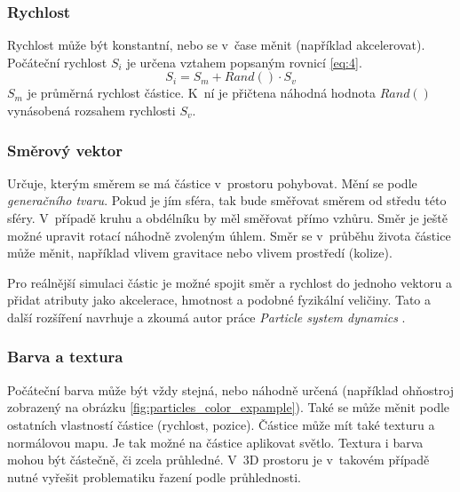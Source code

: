 \subsubsection*{Rychlost} Rychlost může být konstantní, nebo se v~čase měnit (například akcelerovat). Počáteční rychlost \(S_i\) je určena vztahem popsaným rovnicí \ref{eq:4}.
\begin{equation}
S_i = S_m + Rand() \cdot S_v
\label{eq:4}
\end{equation}
\(S_m\) je průměrná rychlost částice. K~ní je přičtena náhodná hodnota \(Rand()\) vynásobená rozsahem rychlosti \(S_v\). 
\subsubsection*{Směrový vektor} Určuje, kterým směrem se má částice v~prostoru pohybovat. Mění se podle \emph{generačního tvaru}. Pokud je jím sféra, tak bude směřovat směrem od středu této sféry. V~případě kruhu a obdélníku by měl směřovat přímo vzhůru. Směr je ještě možné upravit rotací náhodně zvoleným úhlem. Směr se v~průběhu života částice může měnit, například vlivem gravitace nebo vlivem prostředí (kolize).

Pro reálnější simulaci částic je možné spojit směr a rychlost do jednoho vektoru a přidat atributy jako akcelerace, hmotnost a podobné fyzikální veličiny. Tato a další rozšíření navrhuje a zkoumá autor práce \emph{Particle system dynamics} \cite{witkin1999particle}. 

\subsubsection*{Barva a textura} Počáteční barva může být vždy stejná, nebo náhodně určená (například ohňostroj zobrazený na obrázku \ref{fig:particles_color_expample}). Také se může měnit podle ostatních vlastností částice (rychlost, pozice). Částice může mít také texturu a normálovou mapu. Je tak možné na částice aplikovat světlo. Textura i barva mohou být částečně, či zcela průhledné. V~3D prostoru je v~takovém případě nutné vyřešit problematiku řazení podle průhlednosti.

